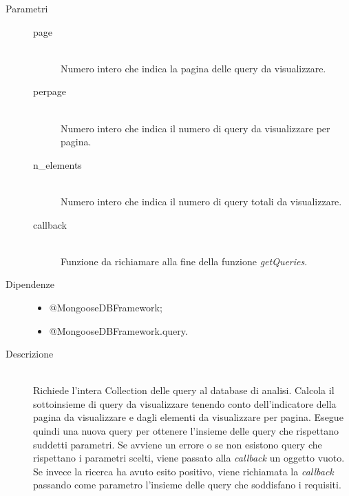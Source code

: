 \begin{description}
\begin{mldescription}
    \begin{description}
	 \item[Parametri] \hfill
	  \begin{description}
	   \item[page] \hfill \\
	   Numero intero che indica la pagina delle query da visualizzare.
	   \item[perpage] \hfill \\
	   Numero intero che indica il numero di query da visualizzare per pagina.
	   \item[n\_elements] \hfill \\
	   Numero intero che indica il numero di query totali da visualizzare.
	   \item[callback] \hfill \\
	   Funzione da richiamare alla fine della funzione \textit{getQueries}.
	  \end{description}
	 \item[Dipendenze] \hfill
	  \begin{itemize}
	   \item @MongooseDBFramework;	   
	   \item @MongooseDBFramework.query.
	  \end{itemize}
	 \item[Descrizione] \hfill \\
	 Richiede l'intera Collection delle query al database di analisi. Calcola il sottoinsieme di query da visualizzare tenendo conto dell'indicatore della pagina da visualizzare e dagli elementi da visualizzare per pagina. Esegue quindi una nuova query per ottenere l'insieme delle query che rispettano suddetti parametri. Se avviene un errore o se non esistono query che rispettano i parametri scelti, viene passato alla \textit{callback} un oggetto vuoto. Se invece la ricerca ha avuto esito positivo, viene richiamata la \textit{callback} passando come parametro l'insieme delle query che soddisfano i requisiti. 
	\end{description}	    
    
    

\end{mldescription}
\end{description}
